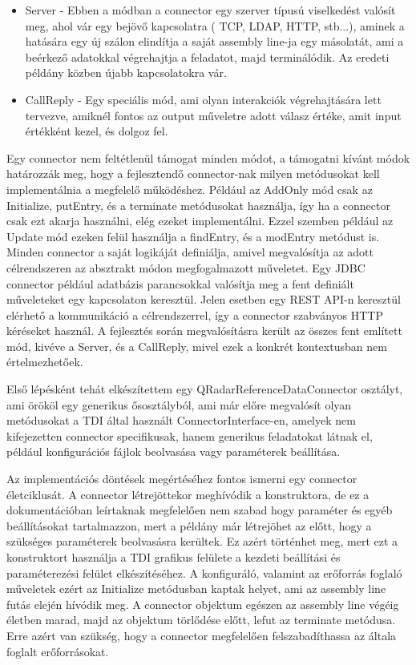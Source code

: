 \begin{itemize}
	\item Server - Ebben a módban a connector egy szerver típusú viselkedést valósít meg, ahol vár egy bejövő kapcsolatra ( TCP, LDAP, HTTP, stb...), aminek a hatására egy új szálon elindítja a saját assembly line-ja egy másolatát, ami a beérkező adatokkal végrehajtja a feladatot, majd terminálódik. Az eredeti példány közben újabb kapcsolatokra vár.
	
	\item CallReply - Egy speciális mód, ami olyan interakciók végrehajtására lett tervezve, amiknél fontos az output műveletre adott válasz értéke, amit input értékként kezel, és dolgoz fel.
\end{itemize}

Egy connector nem feltétlenül támogat minden módot, a támogatni kívánt módok határozzák meg, hogy a fejlesztendő connector-nak milyen metódusokat kell implementálnia a megfelelő működéshez. 
Például az AddOnly mód csak az Initialize, putEntry, és a terminate metódusokat használja, így ha a connector csak ezt akarja használni, elég ezeket implementálni. Ezzel szemben például az Update mód ezeken felül használja a findEntry, és a modEntry metódust is. Minden connector a saját logikáját definiálja, amivel megvalósítja az adott célrendszeren az absztrakt módon megfogalmazott műveletet. Egy JDBC connector például adatbázis parancsokkal valósítja meg a fent definiált műveleteket egy kapcsolaton keresztül. Jelen esetben egy REST API-n keresztül elérhető a kommunikáció a célrendszerrel, így a connector szabványos HTTP kéréseket használ. A fejlesztés során megvalósításra került az összes fent említett mód, kivéve a Server, és a CallReply, mivel ezek a konkrét kontextusban nem értelmezhetőek.

Első lépésként tehát elkészítettem egy QRadarReferenceDataConnector osztályt, ami örököl egy generikus ősosztályból, ami már előre megvalósít olyan metódusokat a TDI által használt ConnectorInterface-en, amelyek nem kifejezetten connector specifikusak, hanem generikus feladatokat látnak el, például konfigurációs fájlok beolvasása vagy paraméterek beállítása.

Az implementációs döntések megértéséhez fontos ismerni egy connector életciklusát. A connector létrejöttekor meghívódik a konstruktora, de ez a dokumentációban leírtaknak megfelelően nem szabad hogy paraméter és egyéb beállításokat tartalmazzon, mert a példány már létrejöhet az előtt, hogy a szükséges paraméterek beolvasásra kerültek. Ez azért történhet meg, mert ezt a konstruktort használja a TDI grafikus felülete a kezdeti beállítási és paraméterezési felület elkészítéséhez. A konfiguráló, valamint az erőforrás foglaló műveletek ezért az Initialize metódusban kaptak helyet, ami az assembly line futás elején hívódik meg. A connector objektum egészen az assembly line végéig életben marad, majd az objektum törlődése előtt, lefut az terminate metódusa. Erre azért van szükség, hogy a connector megfelelően felszabadíthassa az általa foglalt erőforrásokat.

